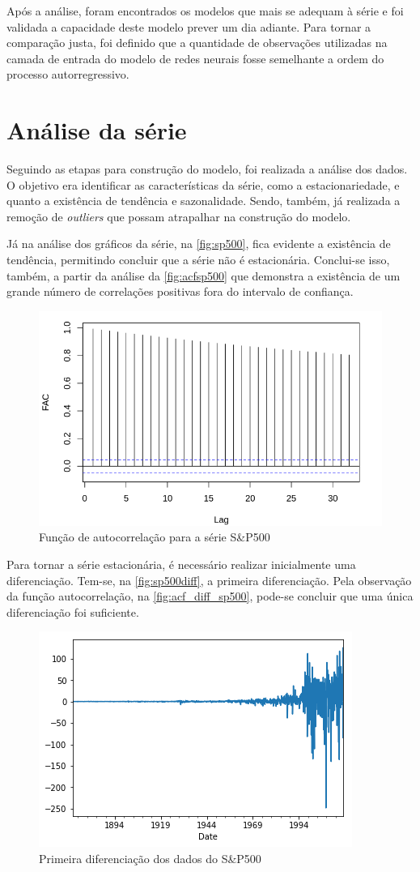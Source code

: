 \documentclass[
    12pt,
    oneside,
    a4paper,
    english,
    brazil
]{abntex2}
\begin{document}
Após a análise, foram encontrados os modelos que mais se adequam à série e foi validada
a capacidade deste modelo prever um dia adiante. Para tornar a comparação justa,
foi definido que a quantidade de observações utilizadas na camada de entrada do
modelo de redes neurais fosse semelhante a ordem do processo autorregressivo.

\section{Análise da série}

Seguindo as etapas para construção do modelo, foi realizada a análise dos dados.
O  objetivo  era identificar  as  características  da  série,  como a estacionariedade,
e quanto  a existência de tendência e  sazonalidade. Sendo, também,
já realizada a remoção de \textit{outliers} que possam atrapalhar na construção
do modelo.

Já na análise dos gráficos da  série, na \autoref{fig:sp500}, fica evidente a
existência de  tendência, permitindo concluir  que a série não  é estacionária.
Conclui-se  isso, também, a  partir  da  análise da  \autoref{fig:acfsp500}  que
demonstra a  existência de um  grande número  de correlações positivas  fora do
intervalo de confiança.

\begin{figure}[ht]
    \centering
    \caption{Função de autocorrelação para a série S\&P500}\label{fig:acfsp500}
    \includegraphics[width=.5\linewidth]{images/SP500_FAC.png}
\end{figure}

Para  tornar  a  série  estacionária, é  necessário  realizar  inicialmente  uma
diferenciação. Tem-se, na \autoref{fig:sp500diff},  a primeira diferenciação. Pela
observação  da função  autocorrelação,  na \autoref{fig:acf_diff_sp500},  pode-se
concluir que uma única diferenciação foi suficiente.

\begin{figure}[ht]
    \centering
    \caption{Primeira diferenciação dos dados do S\&P500}\label{fig:sp500diff}
    \includegraphics[width=.5\linewidth]{images/sp500diff.png}
\end{figure}
\end{document}
